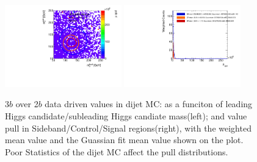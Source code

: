 \begin{figure}[htbp!]
\begin{center}
\includegraphics[width=0.45\textwidth,angle=-90]{figures/boosted/AppendixMuqcdstudy/QCD_ThreeTag_Incl_mH0H1.pdf}
\includegraphics[width=0.45\textwidth,angle=-90]{figures/boosted/AppendixMuqcdstudy/QCD_ThreeTag_Incl_mH0H1_pull.pdf}
\caption{3$b$ over 2$b$ data driven \muqcd values in dijet MC: \muqcd as a funciton of leading Higgs candidate/subleading Higgs candiate mass(left); and \muqcd value pull in Sideband/Control/Signal regions(right), with the weighted mean value and the Guassian fit mean value shown on the plot. Poor Statistics of the dijet MC affect the pull distributions.}
\label{fig:app-muqcd-3b-qcd}
\end{center}
\end{figure}

